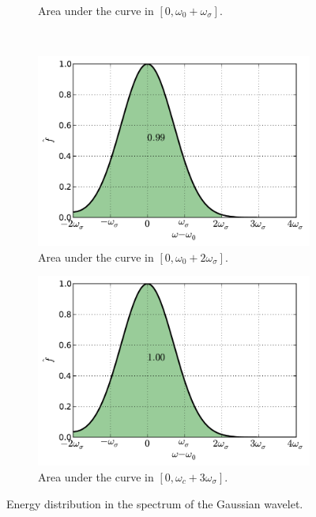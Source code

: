\documentclass[12pt,letterpaper]{article}
\begin{document}
{\begin{figure}[H]
\begin{subfigure}[b]{0.45\textwidth}
        \caption{Area under the curve in $[0,\omega_0 + \omega_\sigma]$.}
    \end{subfigure}\\
    \begin{subfigure}[b]{0.45\textwidth}
        \includegraphics[width=\textwidth]{img/gaussian_area=3.pdf}
        \caption{Area under the curve in $[0,\omega_0 + 2\omega_\sigma]$.}
    \end{subfigure}
    \begin{subfigure}[b]{0.45\textwidth}
        \includegraphics[width=\textwidth]{img/gaussian_area=4.pdf}
        \caption{Area under the curve in $[0,\omega_c + 3\omega_\sigma]$.}
    \end{subfigure}
    \caption{Energy distribution in the spectrum of the Gaussian wavelet.}
    \label{fig:gaussian-areas}
\end{figure}

}
\end{document}
